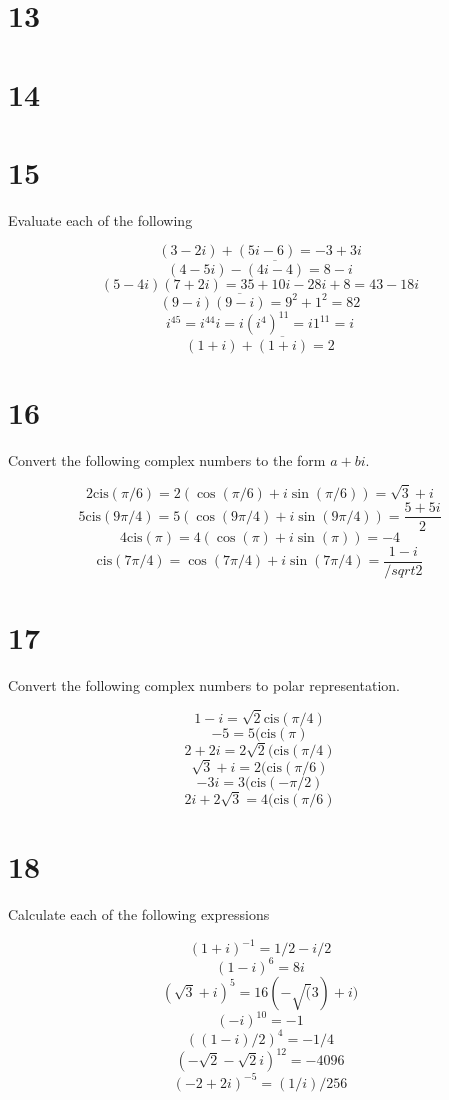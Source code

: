 \documentclass[a4paper]{article}
\begin{document}
\section*{13}


\section*{14}


\section*{15}

Evaluate each of the following

$$(3-2i) + (5i-6) = -3 + 3i$$
$$(4-5i) - \overline{(4i-4)} = 8 - i$$
$$(5-4i)(7+2i) = 35 + 10i - 28i + 8 = 43 - 18i$$
$$(9-i)\overline{(9-i)} = 9^2 + 1^2 = 82$$
$$i^{45} = i^{44} i = i(i^4)^{11} = i 1^{11} = i$$
$$(1+i) + \overline{(1+i)} = 2$$


\section*{16}

Convert the following complex numbers to the form $a + bi$. 

$$2 \text{cis} (\pi/6) = 2(\cos (\pi/6) + i \sin(\pi/6)) = \sqrt{3} + i$$
$$5 \text{cis} (9\pi/4) = 5(\cos (9\pi/4) + i \sin(9\pi/4)) = \frac{5 + 5i}{2}$$
$$4 \text{cis} (\pi) = 4(\cos (\pi) + i \sin(\pi)) = -4$$
$$\text{cis} (7\pi/4) = \cos (7\pi/4) + i \sin(7\pi/4) = \frac{1-i}{/sqrt{2}}$$


\section*{17}

Convert the following complex numbers to polar representation.

$$ 1-i = \sqrt{2} \text{cis}(\pi/4)$$
$$ -5 = 5(\text{cis}(\pi)$$
$$ 2 + 2i = 2\sqrt{2}(\text{cis}(\pi/4)$$
$$ \sqrt{3} + i = 2(\text{cis}(\pi/6)$$
$$ -3i = 3(\text{cis}(-\pi/2)$$
$$ 2i + 2 \sqrt{3} = 4(\text{cis}(\pi/6)$$


\section*{18}

Calculate each of the following expressions

$$(1+i)^{-1} = 1/2 - i/2$$
$$(1-i)^6 = 8i$$
$$(\sqrt{3} + i)^5 = 16 (-\sqrt(3) + i)$$
$$(-i)^{10} = -1$$
$$ ((1-i)/2)^4 = -1/4$$
$$(-\sqrt{2} - \sqrt{2} i)^{12} = -4096$$
$$(-2 + 2i)^{-5} = (1/i)/256$$
\end{document}
